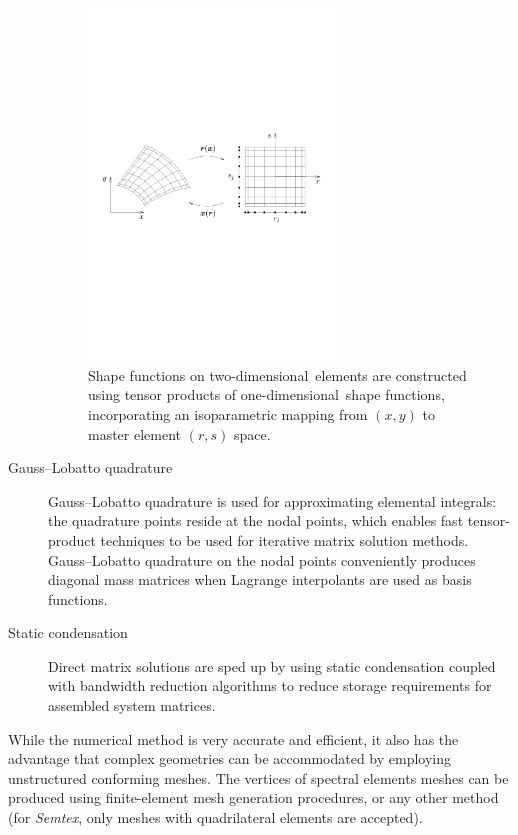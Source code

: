 \documentclass[11pt]{report}
\newcommand{\Semtex}{\emph{Semtex}} \newcommand{\Dog}{\emph{Dog}}
\newcommand\oned{one-di\-men\-sion\-al}
\newcommand\twod{two-di\-men\-sion\-al}
\begin{document}
\begin{description}
\begin{figure}
\begin{center}
  \includegraphics[width=0.65\textwidth]{xyrs}
\end{center}
\caption{Shape functions on \twod\ elements are constructed using
  tensor products of \oned\ shape functions, incorporating an
  isoparametric mapping from $(x,y)$ to master element $(r,s)$ space.
}
\label{fig.xyrs}
\end{figure}

\item[Gauss--Lobatto quadrature] Gauss--Lobatto quadrature is used for
  approximating elemental integrals: the quadrature points reside at
  the nodal points, which enables fast tensor-product techniques to be
  used for iterative matrix solution methods.  Gauss--Lobatto
  quadrature on the nodal points conveniently produces diagonal mass
  matrices when Lagrange interpolants are used as basis functions.
  
\item[Static condensation] Direct matrix solutions are sped up by
  using static condensation coupled with bandwidth reduction
  algorithms to reduce storage requirements for assembled system
  matrices.
\end{description}

While the numerical method is very accurate and efficient, it also has
the advantage that complex geometries can be accommodated by employing
unstructured conforming meshes.  The vertices of spectral elements
meshes can be produced using finite-element mesh generation
procedures, or any other method (for \Semtex, only meshes with
quadrilateral elements are accepted).
\end{document}
